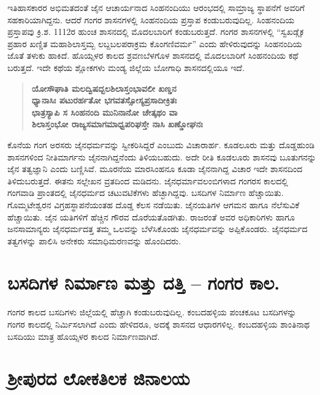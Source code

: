 ಇತಿಹಾಸಕಾರರ ಅಭಿಮತದಂತೆ ಜೈನ ಆಚಾರ್ಯನಾದ ಸಿಂಹನಂದಿಯು ಆರಂಭದಲ್ಲಿ ಸಾಮ್ರಾಜ್ಯ ಸ್ಥಾಪನೆಗೆ ಅವರಿಗೆ ಸಹಕಾರಿಯಾಗಿದ್ದನು. ಆದರೆ ಗಂಗರ ಶಾಸನಗಳಲ್ಲಿ ಸಿಂಹನಂದಿಯ ಪ್ರಸ್ತಾಪ ಕಂಡುಬರುವುದಿಲ್ಲ. ಸಿಂಹನಂದಿಯ ಪ್ರಸ್ತಾಪವು ಕ್ರಿ.ಶ. 1112ರ ಹುಂಚ ಶಾಸನದಲ್ಲಿ ಮೊದಲಬಾರಿಗೆ ಕಂಡುಬರುತ್ತದೆ. ಗಂಗರ ಶಾಸನಗಳಲ್ಲಿ “ಸ್ವಖಡ್ಗೈಕ ಪ್ರಹಾರ ಖಣ್ಡಿತ ಮಹಾಶಿಲಾಸ್ತಮ್ಬ ಲಬ್ದಬಲಪರಾಕ್ರಮ ಕೊಂಗಣಿವರ್ಮ” ಎಂದು ಹೇಳಿರುವುದನ್ನು ಸಿಂಹನಂದಿಯ ಜೊತೆ ತಳುಕು ಹಾಕಿದೆ. ಹೊಯ್ಸಳರ ಕಾಲದ ಶ್ರವಣಬೆಳಗೊಳ ಶಾಸನದಲ್ಲಿ ಮೊದಲಬಾರಿಗೆ ಸಿಂಹನಂದಿಯ ಕಥೆ ಬರುತ್ತದೆ. ಇದೇ ಕಥೆಯ ಶ್ಲೋಕಗಳು ಮಂಡ್ಯ ಜಿಲ್ಲೆಯ ಬೋಗಾಧಿ ಶಾಸನದಲ್ಲಿಯೂ ಇದೆ.

\begin{verse}
\textbf{ಯೋಸೌಘಾತಿ ಮಲದ್ವಿಷದ್ಬಲಶಿಲಾಸ್ತಂಭಾವಲೀ ಖಣ್ಡನ} \\\textbf{ಧ್ಯಾನಾಸಿಃ ಪಟುರರ್ಹತೋ ಭಗವತಸ್ಸೋಸ್ಯಪ್ರಸಾದೀಕ್ರಿತಃ} \\\textbf{ಛಾತ್ರಸ್ಯಾಪಿ ಸ ಸಿಂಹನಂದಿ ಮುನಿನಾನೋ ಚೇತ್ಕಥಂ ವಾ} \\\textbf{ಶಿಲಾಸ್ತಂಭೋ ರಾಜ್ಯಸಮಾಗಮಾಧ್ವಪರಿಘಸ್ತೇ ನಾಸಿ ಖಣ್ಡೋಘನಃ}
\end{verse}

ಕೊನೆಯ ಗಂಗ ಅರಸರು ಜೈನಧರ್ಮವನ್ನು ಸ್ವೀಕರಿಸಿದ್ದರೆ ಎಂಬುದು ವಿಚಾರಾರ್ಹ. ಕೂಡಲೂರು ಮತ್ತು ದೊಡ್ಡಹುಂಡಿ ಶಾಸನಗಳಿಂದ ನೀತಿಮಾರ್ಗನು ಜೈನನಾಗಿದ್ದನೆಂದು ತಿಳಿಯಬಹುದು. ಅದೇ ರೀತಿ ಕೂಡಲೂರು ಶಾಸನವು ಬೂತುಗನನ್ನು ಜೈನ ತತ್ವಜ್ಞಾನಿ ಎಂದು ಬಣ್ಣಿಸಿವೆ. ಮೂರನೆಯ ಮಾರಸಿಂಹನೂ ಕೂಡಾ ಜೈನನಾಗಿದ್ದ ವಿಚಾರ ಇದೇ ಶಾಸನದಿಂದ ತಿಳಿದುಬರುತ್ತದೆ. ಈತನು ಸಲ್ಲೇಖನ ವ್ರತದಿಂದ ಮಡಿದನು. ಜೈನಧರ್ಮಾವಲಂಬಿಗಳಾದ ಗಂಗರಸ ಕಾಲದಲ್ಲಿ ಗಂಗವಾಡಿ ಪ್ರಾಂತದಲ್ಲಿ ಜೈನಧರ್ಮದ ಚಟುವಟಿಕೆಗಳು ಹೆಚ್ಛಾಗಿದ್ದವು. ಬಸದಿಗಳ ನಿರ್ಮಾಣ ಹೆಚ್ಚಾಯಿತು. ಗೊಮ್ಮಟೇಶ್ವರನ ವಿಗ್ರಹಸ್ಥಾಪನೆಯಂತಹ ದೊಡ್ಡ ಕೆಲಸ ನಡೆಯಿತು. ಜೈನಯತಿಗಳ ಆಗಮನ ಹಾಗೂ ನೆಲೆಸುವಿಕೆ ಹೆಚ್ಚಾಯಿತು. ಜೈನ ಯತಿಗಳಿಗೆ ಹೆಚ್ಚಿನ ಗೌರವ ದೊರೆಯತೊಡಗಿತು. ರಾಜರಂತೆ ಅವರ ಅಧಿಕಾರಿಗಳು ಹಾಗೂ ಜನಸಾಮಾನ್ಯರು ಜೈನಧರ್ಮದತ್ತ ತಮ್ಮ ಒಲವನ್ನು ಬೆಳೆಸಿಕೊಂಡು ಜೈನಧರ್ಮವನ್ನು ಅಪ್ಪಿಕೊಂಡರು. ಜೈನಧರ್ಮದ ತತ್ವಗಳನ್ನು ಪಾಲಿಸಿ ಅನೇಕರು ಸಮಾಧಿಮರಣವನ್ನು ಹೊಂದಿದರು.


\section{ಬಸದಿಗಳ ನಿರ್ಮಾಣ ಮತ್ತು ದತ್ತಿ – ಗಂಗರ ಕಾಲ.}

ಗಂಗರ ಕಾಲದ ಬಸದಿಗಳು ಜಿಲ್ಲೆಯಲ್ಲಿ ಹೆಚ್ಚಾಗಿ ಕಂಡುಬರುವುದಿಲ್ಲ. ಕಂಬದಹಳ್ಳಿಯ ಪಂಚಕೂಟ ಬಸದಿಗಳನ್ನು ಗಂಗರ ಕಾಲದಲ್ಲಿ ನಿರ್ಮಿಸಲಾಗಿದೆ ಎಂದು ಹೇಳಿದರೂ, ಅದಕ್ಕೆ ಶಾಸನದ ಆಧಾರಗಳಿಲ್ಲ. ಕಂಬದಹಳ್ಳಿಯ ಶಾಂತಿನಾಥ ಬಸದಿಯು ಮಾತ್ರ ಹೊಯ್ಸಳರ ಕಾಲದ ನಿರ್ಮಾಣವಾಗಿದೆ.


\section{ಶ‍್ರೀಪುರದ ಲೋಕತಿಲಕ ಜಿನಾಲಯ}

